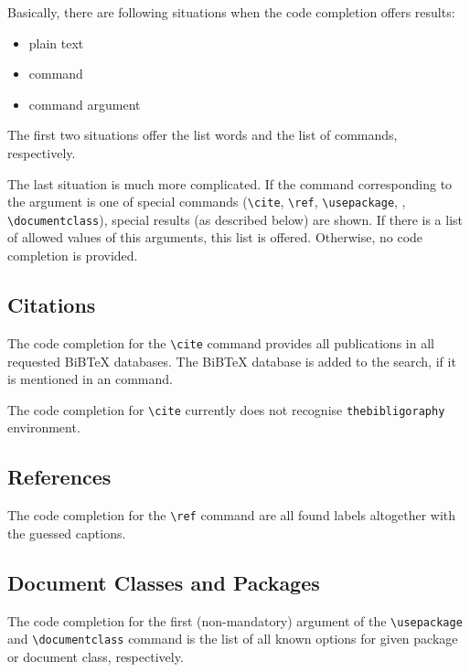 \documentclass{article}
\begin{document}
Basically, there are following situations when the code completion offers results:
\begin{itemize}
\item{plain text}
\item{command}
\item{command argument}
\end{itemize}

The first two situations offer the list words and the list of commands, respectively.

The last situation is much more complicated. If the command corresponding to
the argument is one of special commands (\verb+\cite+, \verb+\ref+,
\verb+\usepackage+, , \verb+\documentclass+),
special results (as described below) are shown. If there is a list of allowed
values of this arguments, this list is offered. Otherwise, no code completion
is provided.


\subsection{Citations}

\label{ssec:citations}

The code completion for the \verb+\cite+ command provides all publications in all
requested BiBTeX databases. The BiBTeX database is added to the search, if it is
mentioned in an \verb++ command.

The code completion for \verb+\cite+ currently does not recognise \verb+thebibligoraphy+
environment.

\subsection{References}

\label{ssec:references}

The code completion for the \verb+\ref+ command are all found labels altogether with
the guessed captions.

\subsection{Document Classes and Packages}

\label{ssec:docclasses:packages}

The code completion for the first (non-mandatory) argument of the \verb+\usepackage+
and \verb+\documentclass+ command is the list of all known options for given package
or document class, respectively.
\end{document}
